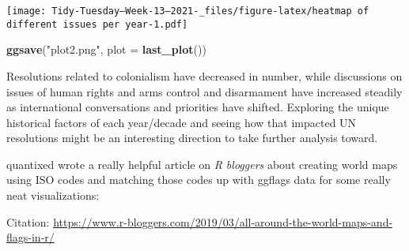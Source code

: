 \documentclass[
]{article}
\newenvironment{Shaded}{\begin{snugshade}}{\end{snugshade}}
\newcommand{\DataTypeTok}[1]{\textcolor[rgb]{0.13,0.29,0.53}{#1}}
\newcommand{\KeywordTok}[1]{\textcolor[rgb]{0.13,0.29,0.53}{\textbf{#1}}}
\newcommand{\NormalTok}[1]{#1}
\newcommand{\StringTok}[1]{\textcolor[rgb]{0.31,0.60,0.02}{#1}}
\begin{document}
\texttt{[image: Tidy-Tuesday---Week-13--2021-\_files/figure-latex/heatmap of different issues per year-1.pdf]}

\begin{Shaded}
\begin{Highlighting}[]
\KeywordTok{ggsave}\NormalTok{(}\StringTok{"plot2.png"}\NormalTok{, }\DataTypeTok{plot =} \KeywordTok{last\_plot}\NormalTok{())}
\end{Highlighting}
\end{Shaded}

Resolutions related to colonialism have decreased in number, while
discussions on issues of human rights and arms control and disarmament
have increased steadily as international conversations and priorities
have shifted. Exploring the unique historical factors of each
year/decade and seeing how that impacted UN resolutions might be an
interesting direction to take further analysis toward.

quantixed wrote a really helpful article on \emph{R bloggers} about
creating world maps using ISO codes and matching those codes up with
ggflags data for some really neat visualizations:

Citation:
\url{https://www.r-bloggers.com/2019/03/all-around-the-world-maps-and-flags-in-r/}
\end{document}
